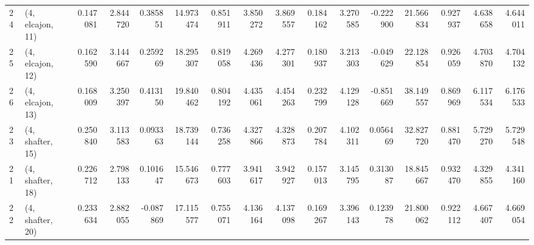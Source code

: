 \begin{tabular}{llrrrrrrrrrrrrrr}
24 &  (4, elcajon, 11) &   0.147081 &  2.844720 &  0.385851 &  14.973474 &  0.851911 &   3.850272 &  3.869557 &  0.184162 &   3.270585 & -0.222900 &   21.566834 &  0.927937 &   4.638658 &   4.644011 \\
25 &  (4, elcajon, 12) &   0.162590 &  3.144667 &  0.259269 &  18.295307 &  0.819058 &   4.269436 &  4.277301 &  0.180937 &   3.213303 & -0.049629 &   22.128854 &  0.926059 &   4.703870 &   4.704132 \\
26 &  (4, elcajon, 13) &   0.168009 &  3.250397 &  0.413150 &  19.840462 &  0.804192 &   4.435061 &  4.454263 &  0.232799 &   4.129128 & -0.851669 &   38.149557 &  0.869969 &   6.117534 &   6.176533 \\
23 &  (4, shafter, 15) &   0.250840 &  3.113583 &  0.093363 &  18.739144 &  0.736258 &   4.327866 &  4.328873 &  0.207784 &   4.102311 &  0.056469 &   32.827720 &  0.881470 &   5.729270 &   5.729548 \\
21 &  (4, shafter, 18) &   0.226712 &  2.798133 &  0.101647 &  15.546673 &  0.777603 &   3.941617 &  3.942927 &  0.157013 &   3.145795 &  0.313087 &   18.845667 &  0.932470 &   4.329855 &   4.341160 \\
22 &  (4, shafter, 20) &   0.233634 &  2.882055 & -0.087869 &  17.115577 &  0.755071 &   4.136164 &  4.137098 &  0.169267 &   3.396143 &  0.123978 &   21.800062 &  0.922112 &   4.667407 &   4.669054 \\
\bottomrule
\end{tabular}
